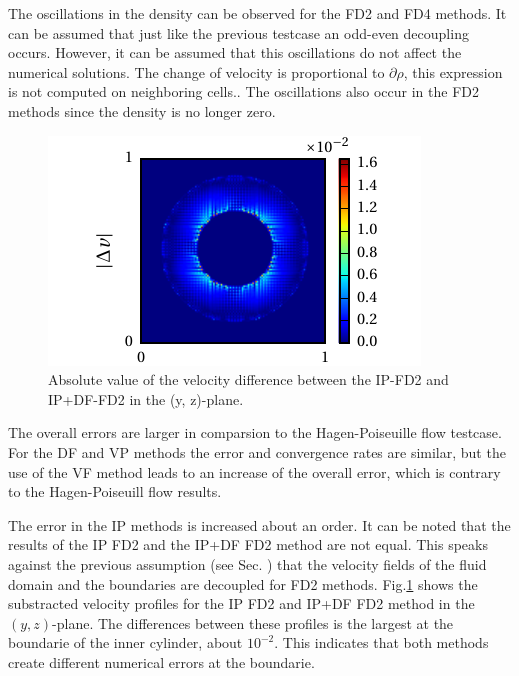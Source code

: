 The oscillations in the density can be observed for the FD2 and FD4 methods.
It can be assumed that just like the previous testcase an odd-even decoupling occurs.
However, it can be assumed that this oscillations do not affect the numerical solutions.
The change of velocity is proportional to $\partial \rho$, this expression is not computed on neighboring cells..
The oscillations also occur in the FD2 methods since the density is no longer zero.%

\begin{figure}[!bp]
  \begin{minipage}[c]{0.4\textwidth}
      \centering
      \includegraphics{gfx/immersed_boundary/tcflow/discussion/vzdiff.pdf}
  \end{minipage}
  \begin{minipage}[c]{0.6\textwidth}
      \caption{Absolute value of the velocity difference between the IP-FD2 and IP+DF-FD2 in the (y, z)-plane.
      \label{valid:hpflow_velodiff_discussion}
      }
  \end{minipage}
\end{figure}

The overall errors are larger in comparsion to the Hagen-Poiseuille flow testcase.
For the DF and VP methods the error and convergence rates are similar, but the
use of the VF method leads to an increase of the overall error, which is contrary to the Hagen-Poiseuill flow results.

The error in the IP methods is increased about an order.
It can be noted that the results of the IP FD2 and the IP+DF FD2 method are not equal.
This speaks against the previous assumption (see Sec.  \label{sec:hpflow_discussion})
that the velocity fields of the fluid domain and the boundaries are decoupled for FD2 methods.
Fig.\ref{valid:hpflow_velodiff_discussion} shows the substracted velocity profiles for the IP FD2 and IP+DF FD2 method in the $(y, z)$-plane.
The differences between these profiles is the largest at the boundarie of the inner cylinder, about $10^{-2}$.
This indicates that both methods create different numerical errors at the boundarie.

